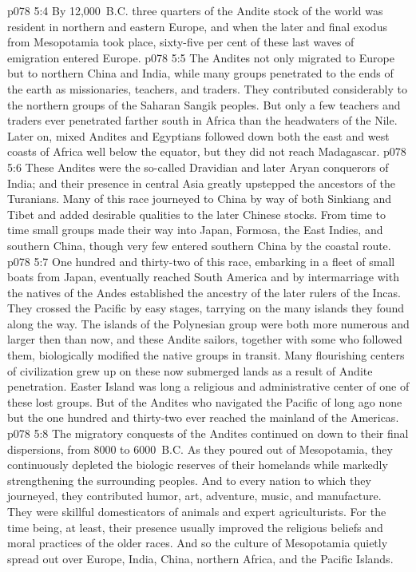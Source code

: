 \pc \vs p078 5:4 By 12,000~B.C. three quarters of the Andite stock of the world was resident in northern and eastern Europe, and when the later and final exodus from Mesopotamia took place, sixty\hyp{}five per cent of these last waves of emigration entered Europe.
\pc \vs p078 5:5 The Andites not only migrated to Europe but to northern China and India, while many groups penetrated to the ends of the earth as missionaries, teachers, and traders. They contributed considerably to the northern groups of the Saharan Sangik peoples. But only a few teachers and traders ever penetrated farther south in Africa than the headwaters of the Nile. Later on, mixed Andites and Egyptians followed down both the east and west coasts of Africa well below the equator, but they did not reach Madagascar.
\vs p078 5:6 These Andites were the so\hyp{}called Dravidian and later Aryan conquerors of India; and their presence in central Asia greatly upstepped the ancestors of the Turanians. Many of this race journeyed to China by way of both Sinkiang and Tibet and added desirable qualities to the later Chinese stocks. From time to time small groups made their way into Japan, Formosa, the East Indies, and southern China, though very few entered southern China by the coastal route.
\vs p078 5:7 One hundred and thirty\hyp{}two of this race, embarking in a fleet of small boats from Japan, eventually reached South America and by intermarriage with the natives of the Andes established the ancestry of the later rulers of the Incas. They crossed the Pacific by easy stages, tarrying on the many islands they found along the way. The islands of the Polynesian group were both more numerous and larger then than now, and these Andite sailors, together with some who followed them, biologically modified the native groups in transit. Many flourishing centers of civilization grew up on these now submerged lands as a result of Andite penetration. Easter Island was long a religious and administrative center of one of these lost groups. But of the Andites who navigated the Pacific of long ago none but the one hundred and thirty\hyp{}two ever reached the mainland of the Americas.\plusone
\pc \vs p078 5:8 The migratory conquests of the Andites continued on down to their final dispersions, from 8000 to 6000~B.C. As they poured out of Mesopotamia, they continuously depleted the biologic reserves of their homelands while markedly strengthening the surrounding peoples. And to every nation to which they journeyed, they contributed humor, art, adventure, music, and manufacture. They were skillful domesticators of animals and expert agriculturists. For the time being, at least, their presence usually improved the religious beliefs and moral practices of the older races. And so the culture of Mesopotamia quietly spread out over Europe, India, China, northern Africa, and the Pacific Islands.\plusone
